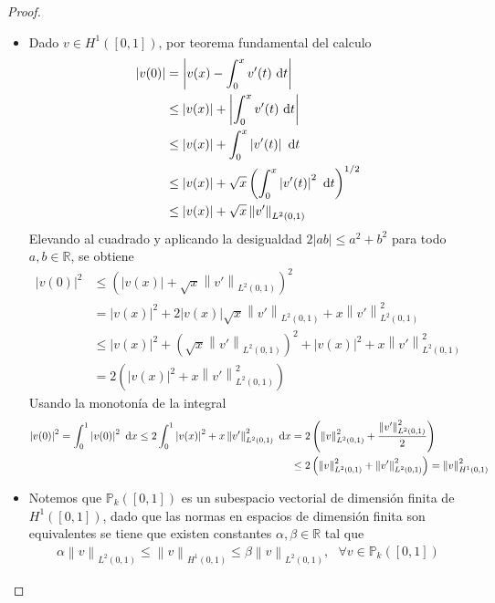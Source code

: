 \documentclass[10pt,a4paper]{report}
\newcommand{\dx}{\textup{d}x}
\newcommand{\dt}{\textup{d}t}
\providecommand{\abs}[1]{\left\lvert#1\right\rvert}
\providecommand{\norm}[1]{\left\lVert#1\right\rVert}
\begin{document}
    \begin{proof}
    	\begin{itemize}
    		\item[$(a)$] Dado $v\in H^{1}([0,1])$, por teorema fundamental del calculo
    		\begin{align*}
    			\abs{v(0)} &= \abs{v(x) - \int_{0}^{x}v'(t)\ \dt}\\
    			           &\leq \abs{v(x)} + \abs{\int_{0}^{x}v'(t)\ \dt}\\
    			           &\leq \abs{v(x)} + \int_{0}^{x}\abs{v'(t)}\ \dt\\
    			           &\leq \abs{v(x)} + \sqrt{x}\left(\int_{0}^{x}\abs{v'(t)}^{2}\ \dt\right)^{1/2}\\
    			           &\leq \abs{v(x)} + \sqrt{x}\norm{v'}_{L^{2}(0,1)}
    		\end{align*}
    	    Elevando al cuadrado y aplicando la desigualdad $2\abs{ab}\leq a^{2} + b^{2}$ para todo $a,b\in \mathbb{R}$, se obtiene
    	    \begin{align*}
    	    	\abs{v(0)}^{2} &\leq \left(\abs{v(x)} + \sqrt{x}\norm{v'}_{L^{2}(0,1)}\right)^{2}\\
    	    	&= \abs{v(x)}^{2} + 2\abs{v(x)}\sqrt{x}\norm{v'}_{L^{2}(0,1)} + x\norm{v'}^{2}_{L^{2}(0,1)}\\
    	    	&\leq \abs{v(x)}^{2} +\left(\sqrt{x}\norm{v'}_{L^{2}(0,1)}\right)^{2} + \abs{v(x)}^{2} + x\norm{v'}^{2}_{L^{2}(0,1)}\\
    	    	&= 2\left(\abs{v(x)}^{2} + x\norm{v'}^{2}_{L^{2}(0,1)}\right)
    	    \end{align*}
            Usando la monotonía de la integral 
            \begin{align*}
            	\abs{v(0)}^{2} = \int_{0}^{1}\abs{v(0)}^{2}\ \dx \leq 2\int_{0}^{1}\abs{v(x)}^{2} + x\norm{v'}^{2}_{L^{2}(0,1)}\ \dx &= 2\left(\norm{v}^{2}_{L^{2}(0,1)} + \frac{\norm{v'}^{2}_{L^{2}(0,1)}}{2}\right)\\ &\leq 2\left(\norm{v}^{2}_{L^{2}(0,1)} + \norm{v'}^{2}_{L^{2}(0,1)}\right) = \norm{v}^{2}_{H^{1}(0,1)}
            \end{align*}
            \item[$(b)$] Notemos que $\mathbb{P}_{k}([0,1])$ es un subespacio vectorial de dimensión finita de $H^{1}([0,1])$, dado que las normas en espacios de dimensión finita son equivalentes se tiene que existen constantes $\alpha,\beta\in \mathbb{R}$ tal que 
            \begin{align*}
            	\alpha\norm{v}_{L^{2}(0,1)} \leq \norm{v}_{H^{1}(0,1)} \leq \beta\norm{v}_{L^{2}(0,1)}, \ \ \ \forall v\in \mathbb{P}_{k}([0,1])

\end{align*}
\end{itemize}
\end{proof}
\end{document}
